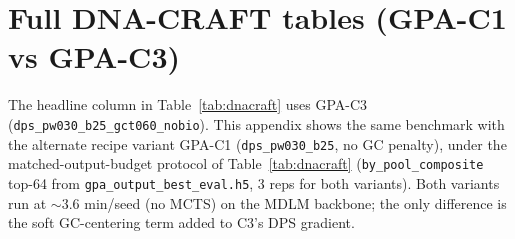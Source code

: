 \section{Full DNA-CRAFT tables (GPA-C1 vs GPA-C3)}\label{app:dnacraft_full}

The headline column in Table~\ref{tab:dnacraft} uses GPA-C3 (\texttt{dps\_pw030\_b25\_gct060\_nobio}). This appendix shows the same benchmark with the alternate recipe variant GPA-C1 (\texttt{dps\_pw030\_b25}, no GC penalty), under the matched-output-budget protocol of Table~\ref{tab:dnacraft} (\texttt{by\_pool\_composite} top-64 from \texttt{gpa\_output\_best\_eval.h5}, 3 reps for both variants). Both variants run at $\sim\!3.6$ min/seed (no MCTS) on the MDLM backbone; the only difference is the soft GC-centering term added to C3's DPS gradient.

